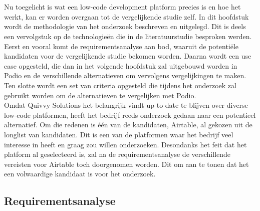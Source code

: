 
\chapter{}%
\label{ch:methodologie}



Nu toegelicht is wat een low-code development platform precies is en hoe het werkt, kan er worden overgaan tot de vergelijkende studie zelf. In dit hoofdstuk wordt de methodologie van het onderzoek beschreven en uitgelegd. Dit is deels een vervolgstuk op de technologieën die in de literatuurstudie besproken werden. Eerst en vooral komt de requirementsanalyse aan bod, waaruit de potentiële kandidaten voor de vergelijkende studie bekomen worden. Daarna wordt een use case opgesteld, die dan in het volgende hoofdstuk zal uitgebouwd worden in Podio en de verschillende alternatieven om vervolgens vergelijkingen te maken. Ten slotte wordt een set van criteria opgesteld die tijdens het onderzoek zal gebruikt worden om de alternatieven te vergelijken met Podio. \\

Omdat Quivvy Solutions het belangrijk vindt up-to-date te blijven over diverse low-code platformen, heeft het bedrijf reeds onderzoek gedaan naar een potentieel alternatief. Om die redenen is één van de kandidaten, Airtable, al gekozen uit de longlist van kandidaten. Dit is een van de platformen waar het bedrijf veel interesse in heeft en graag zou willen onderzoeken. Desondanks het feit dat het platform al geselecteerd is, zal na de requirementsanalyse de verschillende vereisten voor Airtable toch doorgenomen worden. Dit om aan te tonen dat het een volwaardige kandidaat is voor het onderzoek. \\


\section{Requirementsanalyse}
\label{sec:requirementsanalyse}

